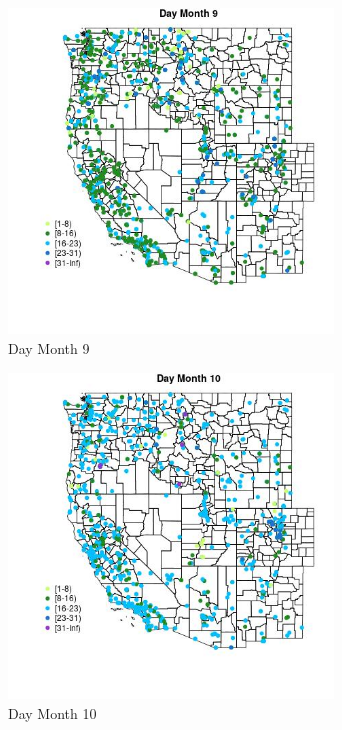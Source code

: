 \begin{figure} 
\centering  
\includegraphics[width=0.77\textwidth]{Code_Outputs/Report_ML_input_PM25_Step4_part_e_de_duplicated_aveswNAs_MapObsMo9Day.jpg} 
\caption{\label{fig:Report_ML_input_PM25_Step4_part_e_de_duplicated_aveswNAsMapObsMo9Day}Day Month 9} 
\end{figure} 
 

\begin{figure} 
\centering  
\includegraphics[width=0.77\textwidth]{Code_Outputs/Report_ML_input_PM25_Step4_part_e_de_duplicated_aveswNAs_MapObsMo10Day.jpg} 
\caption{\label{fig:Report_ML_input_PM25_Step4_part_e_de_duplicated_aveswNAsMapObsMo10Day}Day Month 10} 
\end{figure} 
 

